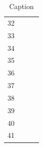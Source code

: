 \documentclass[12pt, a4paper]{article}
\begin{document}
\begin{table}[h!]
\begin{tabular}{|c|c|c|c|}
         \footnotesize 32 & & & \\ 
         \footnotesize 33 & & & \\
         \footnotesize 34 & & & \\
         \footnotesize 35 & & & \\
         \footnotesize 36 & & & \\
         \footnotesize 37 & & & \\
         \footnotesize 38 & & & \\
         \footnotesize 39 & & & \\
         \footnotesize 40 & & & \\
         \footnotesize 41 & & & \\
    \hline
          
    \end{tabular}
    \caption{Caption}
    \label{Tabella Completa}
\end{table}
\end{document}
